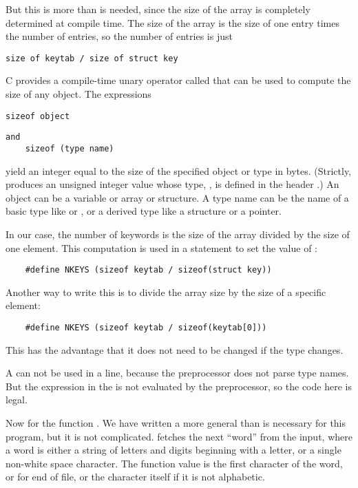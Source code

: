But this is more than is needed, since the size of the array is completely determined at compile time.
The size of the array is the size of one entry times the number of entries, so the number of entries is just
\begin{lstlisting}[basicstyle=\ttfamily\normalsize\itshape, keywordstyle=\color{black}]
	size of keytab / size of struct key
\end{lstlisting}
C provides a compile-time unary operator called  that can be used to compute the size of any object.
The expressions
\begin{lstlisting}[basicstyle=\ttfamily\normalsize\itshape, keywordstyle=\color{black}]
	sizeof object
\end{lstlisting}
\begin{lstlisting}[basicstyle=\ttfamily\normalsize\itshape, keywordstyle=\color{black}]
and
	sizeof (type name)
\end{lstlisting}
yield an integer equal to the size of the specified object or type in bytes.
(Strictly,  produces an unsigned integer value whose type, , is defined in the header .)
An object can be a variable or array or structure.
A type name can be the name of a basic type like  or , or a derived type like a structure or a pointer.

In our case, the number of keywords is the size of the array divided by the size of one element.
This computation is used in a  statement to set the value of :
\begin{lstlisting}
	#define NKEYS (sizeof keytab / sizeof(struct key))
\end{lstlisting}
Another way to write this is to divide the array size by the size of a specific element:
\begin{lstlisting}
	#define NKEYS (sizeof keytab / sizeof(keytab[0]))
\end{lstlisting}
This has the advantage that it does not need to be changed if the type changes.

A  can not be used in a  line, because the preprocessor does not parse type names.
But the expression in the  is not evaluated by the preprocessor, so the code here is legal.

Now for the function .
We have written a more general  than is necessary for this program, but it is not complicated.
 fetches the next ``word'' from the input, where a word is either a string of letters and digits beginning with a letter, or a single non-white space character.
The function value is the first character of the word, or  for end of file, or the character itself if it is not alphabetic.

